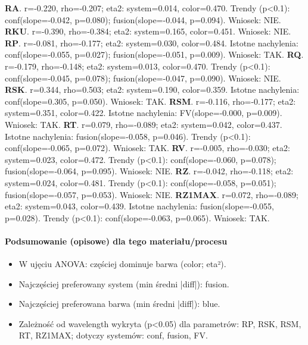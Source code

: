 \documentclass[
  10pt,
]{article}
\begin{document}
\textbf{RA}. r=-0.220, rho=-0.207; eta2: system=0.014, color=0.470.
Trendy (p\textless0.1): conf(slope=-0.042, p=0.080);
fusion(slope=-0.044, p=0.094). Wniosek: NIE. \textbf{RKU}. r=-0.390,
rho=-0.384; eta2: system=0.165, color=0.451. Wniosek: NIE. \textbf{RP}.
r=-0.081, rho=-0.177; eta2: system=0.030, color=0.484. Istotne
nachylenia: conf(slope=-0.055, p=0.027); fusion(slope=-0.051, p=0.009).
Wniosek: TAK. \textbf{RQ}. r=-0.179, rho=-0.148; eta2: system=0.013,
color=0.470. Trendy (p\textless0.1): conf(slope=-0.045, p=0.078);
fusion(slope=-0.047, p=0.090). Wniosek: NIE. \textbf{RSK}. r=0.344,
rho=0.503; eta2: system=0.190, color=0.359. Istotne nachylenia:
conf(slope=0.305, p=0.050). Wniosek: TAK. \textbf{RSM}. r=-0.116,
rho=-0.177; eta2: system=0.351, color=0.422. Istotne nachylenia:
FV(slope=-0.000, p=0.009). Wniosek: TAK. \textbf{RT}. r=0.079,
rho=-0.089; eta2: system=0.042, color=0.437. Istotne nachylenia:
fusion(slope=-0.058, p=0.046). Trendy (p\textless0.1):
conf(slope=-0.065, p=0.072). Wniosek: TAK. \textbf{RV}. r=-0.005,
rho=-0.030; eta2: system=0.023, color=0.472. Trendy (p\textless0.1):
conf(slope=-0.060, p=0.078); fusion(slope=-0.064, p=0.095). Wniosek:
NIE. \textbf{RZ}. r=-0.042, rho=-0.118; eta2: system=0.024, color=0.481.
Trendy (p\textless0.1): conf(slope=-0.058, p=0.051);
fusion(slope=-0.057, p=0.053). Wniosek: NIE. \textbf{RZ1MAX}. r=0.072,
rho=-0.089; eta2: system=0.043, color=0.439. Istotne nachylenia:
fusion(slope=-0.055, p=0.028). Trendy (p\textless0.1):
conf(slope=-0.063, p=0.065). Wniosek: TAK.

\paragraph{Podsumowanie (opisowe) dla tego materiału/procesu}
\begin{itemize}
\item W ujęciu ANOVA: częściej dominuje barwa (color; eta²).
\item Najczęściej preferowany system (min średni |diff|): fusion.
\item Najczęściej preferowana barwa (min średni |diff|): blue.
\item Zależność od wavelength wykryta (p<0.05) dla parametrów: RP, RSK, RSM, RT, RZ1MAX; dotyczy systemów: conf, fusion, FV.
\end{itemize}
\end{document}
